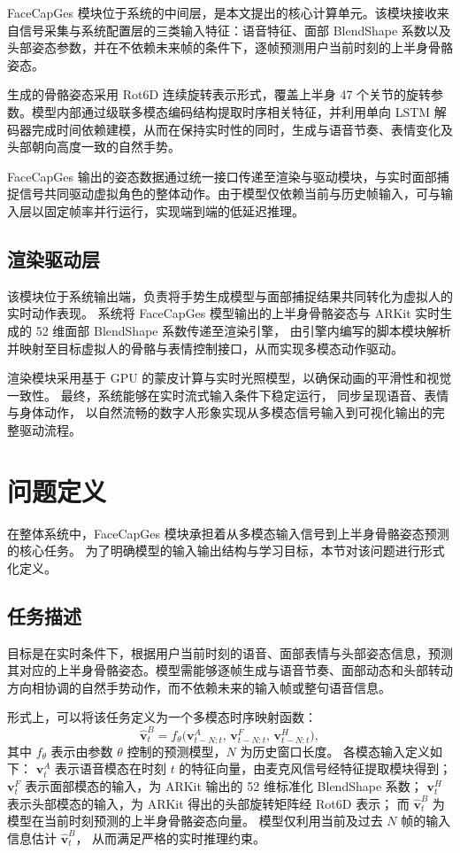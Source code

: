 FaceCapGes 模块位于系统的中间层，是本文提出的核心计算单元。该模块接收来自信号采集与系统配置层的三类输入特征：语音特征、面部 BlendShape 系数以及头部姿态参数，并在不依赖未来帧的条件下，逐帧预测用户当前时刻的上半身骨骼姿态。

生成的骨骼姿态采用 Rot6D 连续旋转表示形式，覆盖上半身 47 个关节的旋转参数。模型内部通过级联多模态编码结构提取时序相关特征，并利用单向 LSTM 解码器完成时间依赖建模，从而在保持实时性的同时，生成与语音节奏、表情变化及头部朝向高度一致的自然手势。

FaceCapGes 输出的姿态数据通过统一接口传递至渲染与驱动模块，与实时面部捕捉信号共同驱动虚拟角色的整体动作。由于模型仅依赖当前与历史帧输入，可与输入层以固定帧率并行运行，实现端到端的低延迟推理。

\subsection{渲染驱动层}

该模块位于系统输出端，负责将手势生成模型与面部捕捉结果共同转化为虚拟人的实时动作表现。
系统将 FaceCapGes 模型输出的上半身骨骼姿态与 ARKit 实时生成的 52 维面部 BlendShape 系数传递至渲染引擎，
由引擎内编写的脚本模块解析并映射至目标虚拟人的骨骼与表情控制接口，从而实现多模态动作驱动。

渲染模块采用基于 GPU 的蒙皮计算与实时光照模型，以确保动画的平滑性和视觉一致性。
最终，系统能够在实时流式输入条件下稳定运行，
同步呈现语音、表情与身体动作，
以自然流畅的数字人形象实现从多模态信号输入到可视化输出的完整驱动流程。

\section{问题定义}
\label{sec:problem}

在整体系统中，FaceCapGes 模块承担着从多模态输入信号到上半身骨骼姿态预测的核心任务。
为了明确模型的输入输出结构与学习目标，本节对该问题进行形式化定义。

\subsection{任务描述}

目标是在实时条件下，根据用户当前时刻的语音、面部表情与头部姿态信息，预测其对应的上半身骨骼姿态。模型需能够逐帧生成与语音节奏、面部动态和头部转动方向相协调的自然手势动作，而不依赖未来的输入帧或整句语音信息。

形式上，可以将该任务定义为一个多模态时序映射函数：
\begin{equation}
\hat{\bm{v}}_{t}^{B} = f_\theta\!\big(\bm{v}_{t-N:t}^{A},\, \bm{v}_{t-N:t}^{F},\, \bm{v}_{t-N:t}^{H}\big),
\end{equation}
其中 $f_\theta$ 表示由参数 $\theta$ 控制的预测模型，$N$ 为历史窗口长度。
%
各模态输入定义如下：
$\bm{v}_{t}^{A}$ 表示语音模态在时刻 $t$ 的特征向量，由麦克风信号经特征提取模块得到；
$\bm{v}_{t}^{F}$ 表示面部模态的输入，为 ARKit 输出的 52 维标准化 BlendShape 系数；
$\bm{v}_{t}^{H}$ 表示头部模态的输入，为 ARKit 得出的头部旋转矩阵经 Rot6D 表示；
而 $\hat{\bm{v}}_{t}^{B}$ 为模型在当前时刻预测的上半身骨骼姿态向量。
%
模型仅利用当前及过去 $N$ 帧的输入信息估计 $\hat{\bm{v}}_{t}^{B}$，
从而满足严格的实时推理约束。

